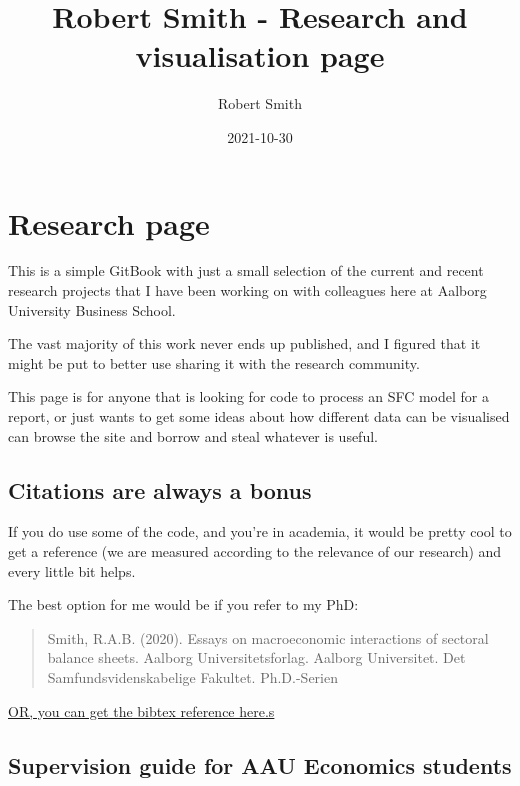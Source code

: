 \documentclass[
]{book}
\title{Robert Smith - Research and visualisation page}
\author{Robert Smith}
\date{2021-10-30}
\begin{document}
\maketitle

{
\setcounter{tocdepth}{1}
\tableofcontents
}
\hypertarget{research-page}{%
\chapter{Research page}\label{research-page}}

This is a simple GitBook with just a small selection of the current and recent research projects that I have been working on with colleagues here at Aalborg University Business School.

The vast majority of this work never ends up published, and I figured that it might be put to better use sharing it with the research community.

This page is for anyone that is looking for code to process an SFC model for a report, or just wants to get some ideas about how different data can be visualised can browse the site and borrow and steal whatever is useful.

\hypertarget{citations-are-always-a-bonus}{%
\section{Citations are always a bonus}\label{citations-are-always-a-bonus}}

If you do use some of the code, and you're in academia, it would be pretty cool to get a reference (we are measured according to the relevance of our research) and every little bit helps.

The best option for me would be if you refer to my PhD:

\begin{quote}
Smith, R.A.B. (2020). Essays on macroeconomic interactions of sectoral balance sheets. Aalborg Universitetsforlag. Aalborg Universitet. Det Samfundsvidenskabelige Fakultet. Ph.D.-Serien
\end{quote}

\href{https://vbn.aau.dk/en/publications/essays-on-macroeconomic-interactions-of-sectoral-balance-sheets}{OR, you can get the bibtex reference here.s}

\hypertarget{supervision-guide-for-aau-economics-students}{%
\section{Supervision guide for AAU Economics students}\label{supervision-guide-for-aau-economics-students}}
\end{document}
